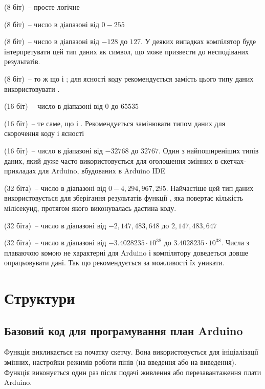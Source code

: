 \documentclass[12pt,a4paper]{report}  %
\begin{document}
     (8 біт)~-- просте логічне 
    
     (8 біт)~--  число в діапазоні від $0-255$
    
     (8 біт)~--  число в діапазоні від $-128$ до $127$. У деяких випадках компілятор буде інтерпретувати цей тип даних як символ, що може призвести до несподіваних результатів.
    
     (8 біт)~-- то ж що і ; для ясності коду рекомендується замість цього типу даних використовувати .
    
     (16 біт)~--  число в діапазоні від $0$ до $65535$
    
     (16 біт)~-- те саме, що і . Рекомендується замінювати типом даних  для скорочення коду і ясності
    
     (16 біт)~-- число в діапазоні від $-32768$ до $32767$. Один з найпоширеніших типів даних, який дуже часто використовується для оголошення змінних в скетчах-прикладах для Arduino, вбудованих в Arduino IDE
    
     (32 біта)~--  число в діапазоні від $0-4,294,967,295$. Найчастіше цей тип даних використовується для зберігання результатів функції , яка повертає кількість мілісекунд, протягом якого виконувалась дастина коду.
    
     (32 біта)~--  число в діапазоні від $-2,147,483,648$ до $2,147,483,647$
    
     (32 біта)~--  число в діапазоні від $-3.4028235\cdot 10^{38}$ до $3.4028235\cdot 10^{38}$. Числа з плаваючою комою не характерні для Arduino і компілятору доведеться довше опрацьовувати дані. Так що рекомендується за можливості їх уникати.


\section{Структури}

\subsection{Базовий код для програмування план Arduino}
Функція   викликається на початку скетчу. Вона використовується для ініціалізації змінних, настройки режимів роботи пінів (на введення або на виведення). Функція  виконується один раз після подачі живлення або перезавантаження плати Arduino.
\end{document}
